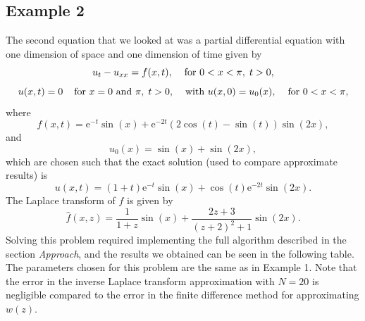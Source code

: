 \documentclass[letterpaper, 12pt]{article}
\def\e{\text{e}}
\begin{document}
	\subsection*{Example 2}
	The second equation that we looked at was a partial differential equation with one dimension of space and one dimension of time given by
	$$u_t-u_{xx}=f(x,t),\hspace{4mm}\text{for }0<x<\pi,\;t>0,$$
 	$$u(x,t)=0\hspace{4mm}\text{for }x=0\text{ and }\pi,\;t>0,\hspace{4mm}\text{with }u(x,0)=u_0(x),\hspace{4mm}\text{for }0<x<\pi,$$
 	where
 	$$f(x,t)=\e^{-t}\sin(x)+\e^{-2t}(2\cos(t)-\sin(t))\sin(2x),$$
 	and
 	$$u_0(x)=\sin(x)+\sin(2x),$$
 	which are chosen such that the exact solution (used to compare approximate results) is
 	$$u(x,t)=(1+t)\e^{-t}\sin(x)+\cos(t)\e^{-2t}\sin(2x).$$
 	The Laplace transform of $f$ is given by
 	$$\hat{f}(x,z)=\frac{1}{1+z}\sin(x)+\frac{2z+3}{(z+2)^2+1}\sin(2x).$$
 	Solving this problem required implementing the full algorithm described in the section \textit{Approach}, and the results we obtained can be seen in the following table. The parameters chosen for this problem are the same as in Example 1. Note that the error in the inverse Laplace transform approximation with $N=20$ is negligible compared to the error in the finite difference method for approximating $w(z)$. 
	
\end{document}
